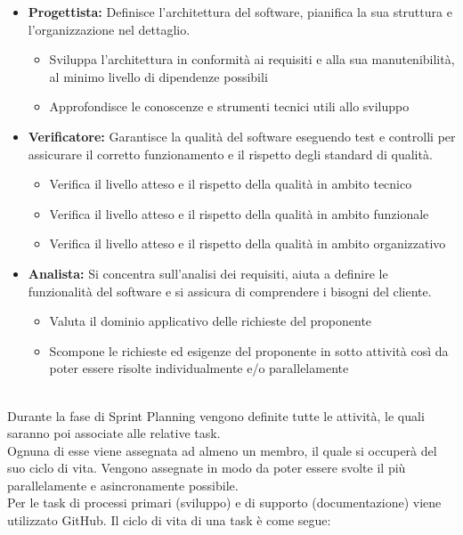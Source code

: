 \begin{itemize}
\begin{itemize}
  \end{itemize}
  \item \textbf{Progettista:} Definisce l'architettura del software, pianifica la sua struttura e l'organizzazione nel dettaglio.
	\begin{itemize}
    \item{Sviluppa l'architettura in conformità ai requisiti e alla sua manutenibilità, al minimo livello di dipendenze possibili}
    \item{Approfondisce le conoscenze e strumenti tecnici utili allo sviluppo}
  \end{itemize}
  \item \textbf{Verificatore:} Garantisce la qualità del software eseguendo test e controlli per assicurare il corretto funzionamento e il rispetto degli standard di qualità.
	\begin{itemize}
    \item{Verifica il livello atteso e il rispetto della qualità in ambito tecnico}
    \item{Verifica il livello atteso e il rispetto della qualità in ambito funzionale}
    \item{Verifica il livello atteso e il rispetto della qualità in ambito organizzativo}
  \end{itemize}
  \item \textbf{Analista:} Si concentra sull'analisi dei requisiti, aiuta a definire le funzionalità del software e si assicura di comprendere i bisogni del cliente.
  \begin{itemize}
    \item{Valuta il dominio applicativo delle richieste del proponente}
    \item{Scompone le richieste ed esigenze del proponente in sotto attività così da poter essere risolte individualmente e/o parallelamente}
  \end{itemize}
\end{itemize}
\\
Durante la fase di Sprint Planning vengono definite tutte le attività, le quali saranno poi associate alle relative task.\\
Ognuna di esse viene assegnata ad almeno un membro, il quale si occuperà del suo ciclo di vita. Vengono assegnate in modo da poter essere svolte il più parallelamente e asincronamente possibile.\\
Per le task di processi primari (sviluppo) e di supporto (documentazione) viene utilizzato GitHub.
Il ciclo di vita di una task è come segue:
